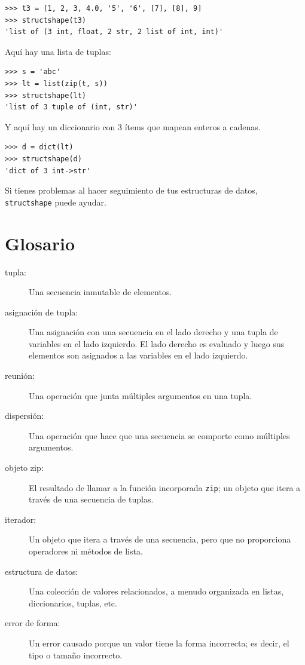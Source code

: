\documentclass[10pt]{book}
\begin{document}
\begin{verbatim}
>>> t3 = [1, 2, 3, 4.0, '5', '6', [7], [8], 9]
>>> structshape(t3)
'list of (3 int, float, 2 str, 2 list of int, int)'
\end{verbatim}
%
Aquí hay una lista de tuplas:

\begin{verbatim}
>>> s = 'abc'
>>> lt = list(zip(t, s))
>>> structshape(lt)
'list of 3 tuple of (int, str)'
\end{verbatim}
%
Y aquí hay un diccionario con 3 ítems que mapean enteros a cadenas.

\begin{verbatim}
>>> d = dict(lt)
>>> structshape(d)
'dict of 3 int->str'
\end{verbatim}
%
Si tienes problemas al hacer seguimiento de tus estructuras de datos,
{\tt structshape} puede ayudar.


\section{Glosario}

\begin{description}

\item[tupla:] Una secuencia inmutable de elementos.

\item[asignación de tupla:] Una asignación con una secuencia en el
lado derecho y una tupla de variables en el lado izquierdo.  El lado
derecho es evaluado y luego sus elementos son asignados a las
variables en el lado izquierdo.

\item[reunión:] Una operación que junta múltiples argumentos en una tupla.

\item[dispersión:] Una operación que hace que una secuencia se comporte como múltiples argumentos.

\item[objeto zip:] El resultado de llamar a la función incorporada {\tt zip};
un objeto que itera a través de una secuencia de tuplas.

\item[iterador:] Un objeto que itera a través de una secuencia, pero
que no proporciona operadores ni métodos de lista.

\item[estructura de datos:] Una colección de valores relacionados, a menudo
organizada en listas, diccionarios, tuplas, etc.

\item[error de forma:] Un error causado porque un valor tiene la forma
incorrecta; es decir, el tipo o tamaño incorrecto.

\end{description}
\end{document}
